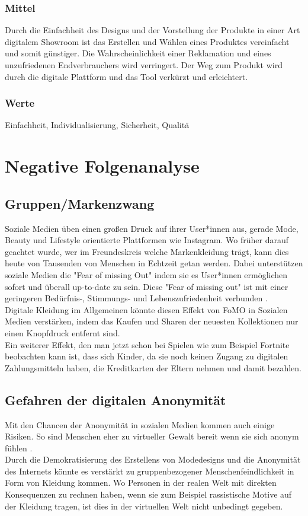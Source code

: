 \documentclass{article}
\begin{document}
\subsubsection{Mittel}
Durch die Einfachheit des Designs und der Vorstellung der Produkte in einer Art digitalem Showroom ist das Erstellen und Wählen eines Produktes vereinfacht und somit günstiger. Die Wahrscheinlichkeit einer Reklamation und eines unzufriedenen Endverbrauchers wird verringert. Der Weg zum Produkt wird durch die digitale Plattform und das Tool verkürzt und erleichtert.
\subsubsection{Werte}
Einfachheit, Individualisierung, Sicherheit, Qualitä

\newpage

\section{Negative Folgenanalyse}

\subsection{Gruppen/Markenzwang}
Soziale Medien üben einen großen Druck auf ihrer User*innen aus, gerade Mode, Beauty und Lifestyle orientierte Plattformen wie Instagram. Wo früher darauf geachtet wurde, wer im Freundeskreis welche Markenkleidung trägt, kann dies heute von Tausenden von Menschen in Echtzeit getan werden. Dabei unterstützen soziale Medien die "Fear of missing Out" indem sie es User*innen ermöglichen sofort und überall up-to-date zu sein. Diese "Fear of missing out" ist mit einer geringeren Bedürfnis-, Stimmungs- und Lebenszufriedenheit verbunden \cite{Przybylski2013}. 
\\[2ex]
Digitale Kleidung im Allgemeinen könnte diesen Effekt von FoMO in Sozialen Medien verstärken, indem das Kaufen und Sharen der neuesten Kollektionen nur einen Knopfdruck entfernt sind.
\\[2ex]
Ein weiterer Effekt, den man jetzt schon bei Spielen wie zum Beispiel Fortnite beobachten kann ist, dass sich Kinder, da sie noch keinen Zugang zu digitalen Zahlungsmitteln haben, die Kreditkarten der Eltern nehmen und damit bezahlen.

\subsection{Gefahren der digitalen Anonymität}
Mit den Chancen der Anonymität in sozialen Medien kommen auch einige Risiken. So sind Menschen eher zu virtueller Gewalt bereit wenn sie sich anonym fühlen \cite{1971-08069-001}.
\\[2ex]
Durch die Demokratisierung des Erstellens von Modedesigns und die Anonymität des Internets könnte es verstärkt zu gruppenbezogener Menschenfeindlichkeit in Form von Kleidung kommen. Wo Personen in der realen Welt mit direkten Konsequenzen zu rechnen haben, wenn sie zum Beispiel rassistische Motive auf der Kleidung tragen, ist dies in der virtuellen Welt nicht unbedingt gegeben.
\end{document}
